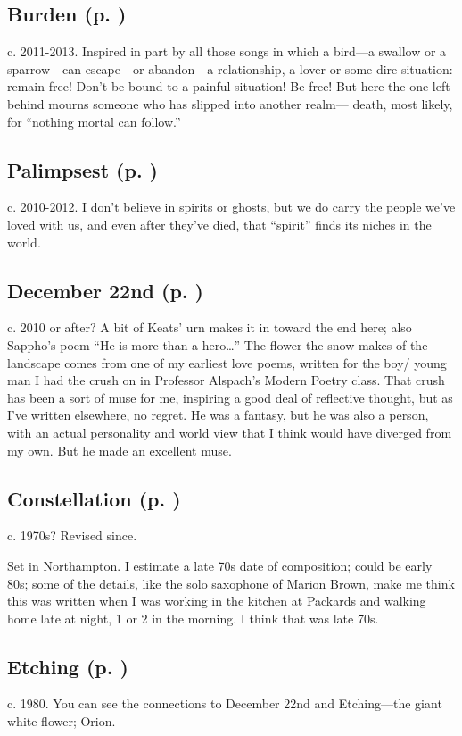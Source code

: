 \subsection*{Burden (p. \pageref{ch:burden})}
c. 2011-2013. Inspired in part by all those songs in
which a bird---a swallow or a sparrow---can escape---or abandon---a
relationship, a lover or some dire situation: remain free! Don't be
bound to a painful situation! Be free! But here the one left behind
mourns someone who has slipped into another realm--- death, most
likely, for ``nothing mortal can follow.''

\subsection*{Palimpsest (p. \pageref{ch:palimpsest})}
c. 2010-2012. I don't believe in spirits or ghosts, but
we do carry the people we've loved with us, and even after they've died,
that ``spirit'' finds its niches in the world.

\subsection*{December 22nd (p. \pageref{ch:december_22})}

c. 2010 or after? A bit of Keats' urn makes it in
toward the end here; also Sappho's poem ``He is more than a hero\ldots''
The flower the snow makes of the landscape comes from one of my earliest
love poems, written for the boy/ young man I had the crush on in
Professor Alspach's Modern Poetry class. That crush has been a sort of
muse for me, inspiring a good deal of reflective thought, but as I've
written elsewhere, no regret. He was a fantasy, but he was also a
person, with an actual personality and world view that I think would
have diverged from my own. But he made an excellent muse.

\subsection*{Constellation (p. \pageref{ch:constellation})}
c. 1970s? Revised since.

Set in Northampton. I estimate
a late 70s date of composition; could be early 80s; some of the details,
like the solo saxophone of Marion Brown, make me think this was written
when I was working in the kitchen at Packards and walking home late at
night, 1 or 2 in the morning. I think that was late 70s.

\subsection*{Etching (p. \pageref{ch:etching})}
c. 1980. You can see the connections to December 22nd
and Etching---the giant white flower; Orion.


